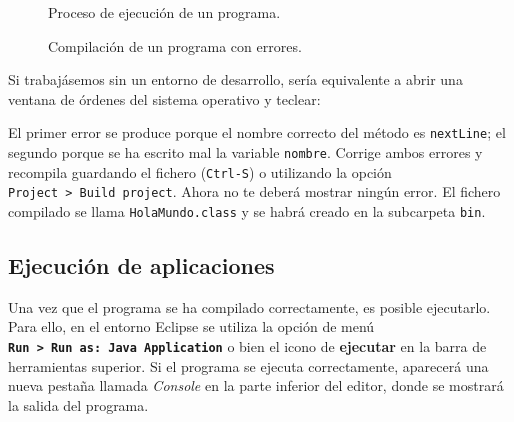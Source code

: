 \documentclass[
  spanish,
  11pt,
  a4paper,
  DIV=11,
  numbers=noendperiod]{scrartcl}
\begin{document}
\begin{figure}
\caption{Proceso de ejecución de un programa.}\label{fig-file_types}
\end{figure}

\begin{figure}
\caption{Compilación de un programa con errores.}\label{fig-compilation_errors}
\end{figure}

Si trabajásemos sin un entorno de desarrollo, sería equivalente a abrir una ventana de órdenes del sistema operativo y teclear:


\begin{tcolorbox}[enhanced jigsaw, toprule=.15mm, coltitle=black, titlerule=0mm, opacitybacktitle=0.6, breakable, colback=white, colframe=quarto-callout-note-color-frame, colbacktitle=quarto-callout-note-color!10!white, opacityback=0, title={Resolución de errores de compilación}, bottomtitle=1mm, rightrule=.15mm, toptitle=1mm, left=2mm, bottomrule=.15mm, leftrule=.75mm, arc=.35mm]

El primer error se produce porque el nombre correcto del método es \texttt{nextLine}; el segundo porque se ha escrito mal la variable \texttt{nombre}. Corrige ambos errores y recompila guardando el fichero (\texttt{Ctrl-S}) o utilizando la opción \texttt{Project\ \textgreater{}\ Build\ project}. Ahora no te deberá mostrar ningún error. El fichero compilado se llama \texttt{HolaMundo.class} y se habrá creado en la subcarpeta \texttt{bin}.

\end{tcolorbox}

\subsection{Ejecución de aplicaciones}\label{ejecuciuxf3n-de-aplicaciones}

Una vez que el programa se ha compilado correctamente, es posible ejecutarlo. Para ello, en el entorno Eclipse se utiliza la opción de menú \textbf{\texttt{Run\ \textgreater{}\ Run\ as:\ Java\ Application}} o bien el icono de \textbf{ejecutar} en la barra de herramientas superior. Si el programa se ejecuta correctamente, aparecerá una nueva pestaña llamada \emph{Console} en la parte inferior del editor, donde se mostrará la salida del programa.
\end{document}
